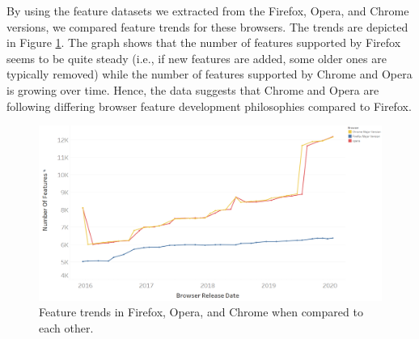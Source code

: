 By using the feature datasets we extracted from the Firefox, Opera, and Chrome
versions, we compared feature trends for these browsers. The trends are
depicted in Figure \ref{fig:featuretrends}. The graph shows that the
  number of features supported by Firefox seems to be quite steady
  (i.e., if new features are added, some older ones are typically
  removed) while the number of features supported by Chrome and Opera is growing
  over time. Hence, the data suggests that Chrome and Opera are
  following differing browser feature development philosophies compared to Firefox.

\begin{figure}[ht]
    \centering
    \includegraphics[width=\columnwidth]{figures/Feature-Trends.PNG}
    \caption{Feature trends in Firefox, Opera, and Chrome when compared to
      each other.}
    \label{fig:featuretrends}
\end{figure}
